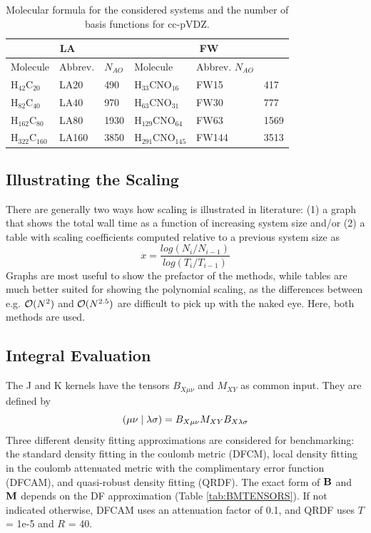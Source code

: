 \begin{table}
\centering
\begin{tabular}{llllll}
\hline
\multicolumn{3}{c}{LA} & \multicolumn{3}{c}{FW} \\ \hline
Molecule & Abbrev. & $N_{AO}$ & Molecule & Abbrev. $N_{AO}$ \\ \hline
H$_{42}$C$_{20}$ & LA20 & 490 & H$_{33}$CNO$_{16}$ & FW15 & 417 \\
H$_{82}$C$_{40}$ & LA40 & 970 & H$_{63}$CNO$_{31}$ & FW30 & 777 \\
H$_{162}$C$_{80}$ & LA80 & 1930 & H$_{129}$CNO$_{64}$ & FW63 & 1569  \\
H$_{322}$C$_{160}$ & LA160 & 3850 & H$_{291}$CNO$_{145}$ & FW144 & 3513 \\
\hline  
\end{tabular}
\caption{Molecular formula for the considered systems and the number of basis functions for cc-pVDZ. \label{tab:GS_NBAS}}
\end{table}

\subsection{Illustrating the Scaling}

There are generally two ways how scaling is illustrated in literature: (1) a graph that shows the total wall time as a function of increasing system size and/or (2) a table with scaling coefficients computed relative to a previous system size as
\begin{equation}
x = \frac{log(N_i/N_{i-1})}{log(T_i/T_{i-1})}
\end{equation} 
\noindent Graphs are most useful to show the prefactor of the methods, while tables are much better suited for showing the polynomial scaling, as the differences between e.g. $\mathcal{O}(N^{2})$ and $\mathcal{O}(N^{2.5})$ are difficult to pick up with the naked eye. Here, both methods are used. 

\FloatBarrier

\subsection{Integral Evaluation}

The J and K kernels have the tensors $B_{X\mu\nu}$ and $M_{XY}$ as common input. They are defined by
\begin{equation}
\left( \mu\nu \mid \lambda\sigma \right) = B_{X\mu\nu} M_{XY} B_{X\lambda\sigma}
\end{equation}
\noindent Three different density fitting approximations are considered for benchmarking: the standard density fitting in the coulomb metric (DFCM), local density fitting in the coulomb attenuated metric with the complimentary error function (DFCAM), and quasi-robust density fitting (QRDF). The exact form of $\mathbf{B}$ and $\mathbf{M}$ depends on the DF approximation (Table \ref{tab:BMTENSORS}). If not indicated otherwise, DFCAM uses an attenuation factor of 0.1, and QRDF uses $T$ = 1e-5 and $R$ = 40. 

